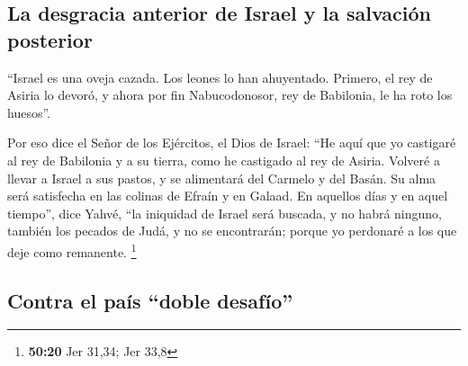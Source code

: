 \hypertarget{la-desgracia-anterior-de-israel-y-la-salvaciuxf3n-posterior}{%
\subsection{La desgracia anterior de Israel y la salvación
posterior}\label{la-desgracia-anterior-de-israel-y-la-salvaciuxf3n-posterior}}

 ``Israel es una oveja cazada. Los leones lo han
ahuyentado. Primero, el rey de Asiria lo devoró, y ahora por fin
Nabucodonosor, rey de Babilonia, le ha roto los huesos''.

 Por eso dice el Señor de los Ejércitos, el Dios de
Israel: ``He aquí que yo castigaré al rey de Babilonia y a su tierra,
como he castigado al rey de Asiria.  Volveré a llevar a
Israel a sus pastos, y se alimentará del Carmelo y del Basán. Su alma
será satisfecha en las colinas de Efraín y en Galaad.  En
aquellos días y en aquel tiempo'', dice Yahvé, ``la iniquidad de Israel
será buscada, y no habrá ninguno, también los pecados de Judá, y no se
encontrarán; porque yo perdonaré a los que deje como remanente.
\footnote{\textbf{50:20} Jer 31,34; Jer 33,8}

\hypertarget{contra-el-pauxeds-doble-desafuxedo}{%
\subsection{Contra el país ``doble
desafío''}\label{contra-el-pauxeds-doble-desafuxedo}}

